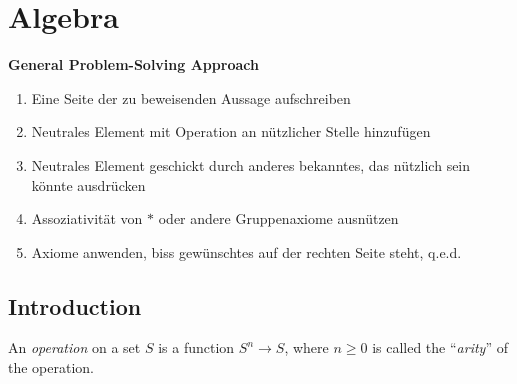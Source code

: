 

\section{Algebra}

\textbf{General Problem-Solving Approach}
\begin{enumerate}
  \item Eine Seite der zu beweisenden Aussage aufschreiben
  \item Neutrales Element mit Operation an nützlicher Stelle hinzufügen
  \item Neutrales Element geschickt durch anderes bekanntes, das nützlich sein
  könnte ausdrücken
  \item Assoziativität von $*$ oder andere Gruppenaxiome ausnützen
  \item Axiome anwenden, biss gewünschtes auf der rechten Seite steht, q.e.d.
\end{enumerate}

\subsection{Introduction}

\Def[Operation] An \emph{operation} on a set $S$ is a function $S^n\to S$, where
$n\geq 0$ is called the ``\emph{arity}'' of the operation.

\begin{comment}
\Com Operations with arity $1$ and $2$ are called unary and binary operations,
respectively. An operation with arity 0 is called a constant (or nullary); it is
a fixed element from the set $S$. In many cases, only binary operations are
actually listed explicitly.
\end{comment}


